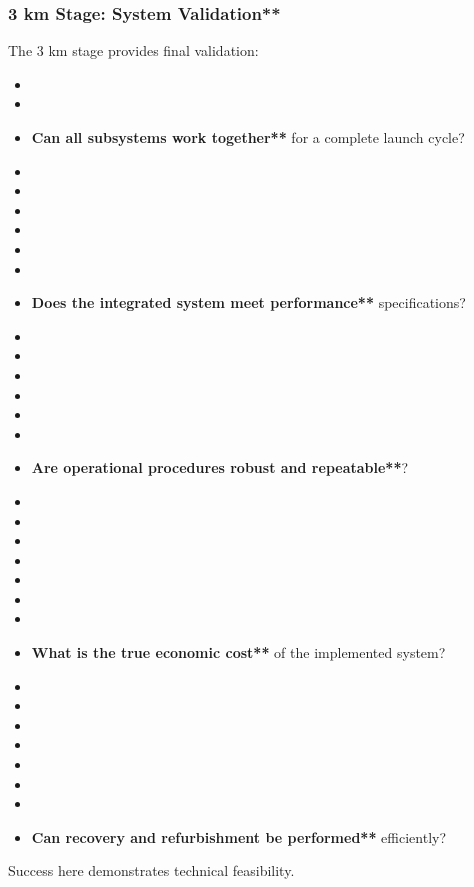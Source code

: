 \subsubsection{3 km Stage: System Validation**}
The 3 km stage provides final validation:
\begin{itemize}
    \item \item \item \textbf{Can all subsystems work together**} for a complete launch cycle?
    \item \item \item \item \item \item \item \textbf{Does the integrated system meet performance**} specifications?
    \item \item \item \item \item \item \item \textbf{Are operational procedures robust and repeatable**}?
    \item \item \item \item \item \item \item \item \textbf{What is the true economic cost**} of the implemented system?
    \item \item \item \item \item \item \item \item \textbf{Can recovery and refurbishment be performed**} efficiently?
\end{itemize}
Success here demonstrates technical feasibility.

